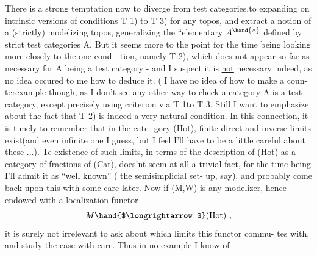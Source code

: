 There is a strong temptation now to diverge from test categories,\hand{\textbackslash}to
\margin{\unsure{--}}expanding on intrinsic versions of conditions  T 1) to T 3) for any topos,
and extract a notion of a (strictly) modelizing topos,  generalizing the
``elementary  $A^{\hand{\wedge}}$ defined by strict test categories A.  But it seems
more to the point for the time being looking more closely to the one condi-%
tion,  namely T 2),  which does not appear so far as necessary for A being
a test category  -  and I suspect it is \uline{not} necessary indeed,  as no idea
occured to me how to deduce it\hand{(}\hand{)}. ( I have no idea of how to make a coun-%
terexample though,  as I don't see any other way to check a category A is
a test category,  except precisely using  criterion via T 1\hand{)}to T 3\hand{)}.\hand{)}
Still I want to emphasize about the fact that T 2) \uline{is indeed a very natural}
\uline{condition}.  In this connection,  it is timely to remember that in the cate-%
gory (Hot),  finite direct and inverse limits exist(and even infinite one
I guess,  but I feel I'll have to be a little careful about these ...).
Te existence of such limits,  in terms of the description of (Hot) as a
category of fractions of (Cat),  does'nt seem at all a trivial fact,  for
the time being I'll admit it as  ``well known'' ( the semisimplicial set-%
up,  say),  and probably come back upon this with some care later.  Now if
 (M,W) is any modelizer,  hence endowed with a localization functor
\[ M \hand{$\longrightarrow$} (\mathrm{Hot}) \ , \]
it is surely not irrelevant to ask about which limits this functor commu-%
tes with,  and study the case with care.  Thus in no  example I know of

